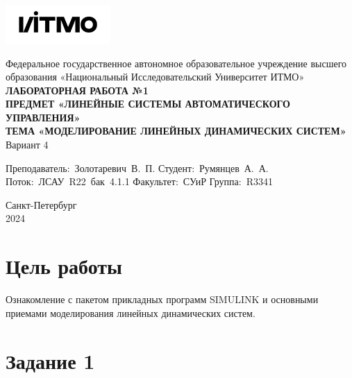 \documentclass[a4paper, 12pt]{article}
\begin{document}
    \begin{titlepage}

        \begin{center}
        \includegraphics[width=0.3\textwidth]{itmo.png} %
        \vfill
        
        Федеральное государственное автономное образовательное учреждение высшего образования
        «Национальный Исследовательский Университет ИТМО»\\
        
        \vfill
        {\large\bf ЛАБОРАТОРНАЯ РАБОТА №1}\\
        {\large\bf ПРЕДМЕТ «ЛИНЕЙНЫЕ СИСТЕМЫ АВТОМАТИЧЕСКОГО УПРАВЛЕНИЯ»}\\
        {\large\bf ТЕМА «МОДЕЛИРОВАНИЕ ЛИНЕЙНЫХ ДИНАМИЧЕСКИХ СИСТЕМ»}\\
        Вариант 4
        \vfill

        \begin{flushright}
            \begin{minipage}{.45\textwidth}
            {
                \hbox{Преподаватель: Золотаревич В. П.}
                \hbox{Студент: Румянцев А. А.}
                \hbox{Поток: ЛСАУ R22 бак 4.1.1}
                \hbox{}
                \hbox{Факультет: СУиР}
                \hbox{Группа: R3341}
            }
            \end{minipage}
        \end{flushright}
        
        \vfill
                
        Санкт-Петербург\\
        2024
        \end{center}
    \end{titlepage}
    
    \tableofcontents

    \newpage
    \section{Цель работы}
    Ознакомление с пакетом прикладных программ SIMULINK и основными приемами моделирования линейных динамических систем.


    \section{Задание 1}
\end{document}
